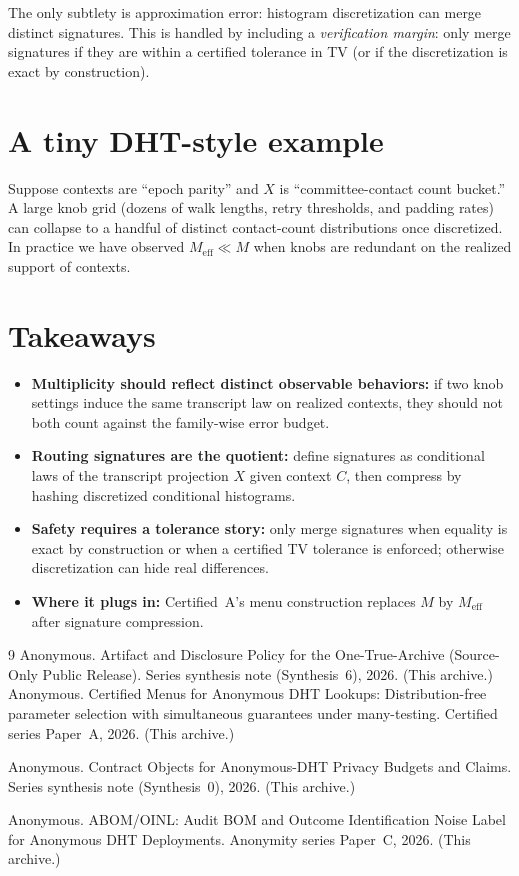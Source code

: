 \documentclass[11pt]{article}
\begin{document}
The only subtlety is approximation error: histogram discretization can merge distinct signatures.
This is handled by including a \emph{verification margin}: only merge signatures if they are within a certified tolerance in TV (or if the discretization is exact by construction).

\section{A tiny DHT-style example}
Suppose contexts are ``epoch parity'' and $X$ is ``committee-contact count bucket.''
A large knob grid (dozens of walk lengths, retry thresholds, and padding rates) can collapse to a handful of distinct contact-count distributions once discretized.
In practice we have observed $M_{\mathrm{eff}}\ll M$ when knobs are redundant on the realized support of contexts.

\section{Takeaways}
\begin{itemize}[leftmargin=*]
\item \textbf{Multiplicity should reflect distinct observable behaviors:} if two knob settings induce the same transcript law on realized contexts, they should not both count against the family-wise error budget.
\item \textbf{Routing signatures are the quotient:} define signatures as conditional laws of the transcript projection $X$ given context $C$, then compress by hashing discretized conditional histograms.
\item \textbf{Safety requires a tolerance story:} only merge signatures when equality is exact by construction or when a certified TV tolerance is enforced; otherwise discretization can hide real differences.
\item \textbf{Where it plugs in:} Certified~A's menu construction replaces $M$ by $M_{\mathrm{eff}}$ after signature compression.
\end{itemize}

\begin{thebibliography}{9}\small
{}
Anonymous.
\newblock Artifact and Disclosure Policy for the One-True-Archive (Source-Only Public Release).
\newblock Series synthesis note (Synthesis~6), 2026. (This archive.)
Anonymous.
\newblock Certified Menus for Anonymous DHT Lookups: Distribution-free parameter selection with simultaneous guarantees under many-testing.
\newblock Certified series Paper~A, 2026. (This archive.)

Anonymous.
\newblock Contract Objects for Anonymous-DHT Privacy Budgets and Claims.
\newblock Series synthesis note (Synthesis~0), 2026. (This archive.)

Anonymous.
\newblock ABOM/OINL: Audit BOM and Outcome Identification Noise Label for Anonymous DHT Deployments.
\newblock Anonymity series Paper~C, 2026. (This archive.)

\end{thebibliography}
\end{document}

